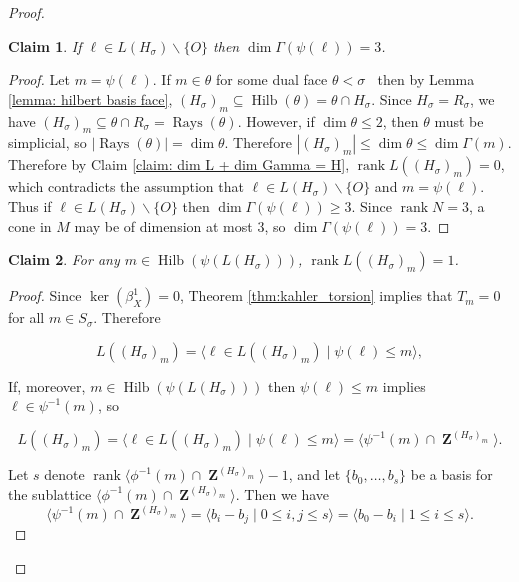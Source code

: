 \documentclass[10pt,a4paper]{amsart}
\newtheorem{claim}{Claim}
\DeclareMathOperator{\Hilb}{Hilb}
\DeclareMathOperator{\Rays}{Rays}
\DeclareMathOperator{\ZZ}{\mathbf{Z}}
\DeclareMathOperator{\dual}{\!^{\vee}}
\DeclareMathOperator{\rank}{rank}
\begin{document}
\begin{proof}
    \begin{claim} \label{claim: dim Gamma = 3}
        If $\ell \in L(H_\sigma) \backslash \{ O\}$ then $\dim \Gamma(\psi(\ell)) = 3$.
    \end{claim}
    \begin{proof}
        Let $m = \psi(\ell)$. If $m \in \theta$ for some dual face $\theta < \sigma\dual$ then by Lemma \ref{lemma: hilbert basis face}, $(H_\sigma)_m \subseteq \Hilb(\theta) =  \theta \cap H_\sigma$. Since $H_\sigma = R_\sigma$, we have $(H_\sigma)_m \subseteq \theta \cap R_\sigma= \Rays(\theta)$. However, if $\dim \theta \leq 2$, then $\theta$ must be simplicial, so $|\Rays(\theta)| = \dim \theta$. Therefore $|(H_\sigma)_m| \leq \dim \theta \leq \dim \Gamma(m)$. Therefore by Claim \ref{claim: dim L + dim Gamma = H}, $\rank L((H_\sigma)_m) = 0$, which contradicts the assumption that $\ell \in L(H_\sigma)\backslash \{O \} $ and $m = \psi(\ell)$. Thus if $\ell \in L(H_\sigma) \backslash \{ O\}$ then $\dim \Gamma(\psi(\ell)) \geq 3$. Since $\rank N =3$, a cone in $M$ may be of dimension at most $3$, so $\dim \Gamma(\psi(\ell)) = 3$.  \end{proof}

    \begin{claim} \label{claim: dim L(Hm) = 1}
        For any $m \in \Hilb(\psi(L(H_\sigma)))$, $\rank L((H_\sigma)_m) = 1$.
    \end{claim}
    \begin{proof}
        Since $\ker(\beta^1_X)=0$, Theorem \ref{thm:kahler_torsion} implies that $T_m = 0$ for all $m \in S_\sigma$. Therefore
	
	\begin{equation}
		L((H_\sigma)_m) = \langle \ell \in L((H_\sigma)_m) \mid \psi(\ell) \leq m \rangle,
	\end{equation}
	
	If, moreover, $m \in \Hilb(\psi(L(H_\sigma)))$ then $\psi(\ell) \leq m$ implies $\ell \in \psi^{-1}(m)$, so
	
	\begin{equation}
		L((H_\sigma)_m) = \langle \ell \in L((H_\sigma)_m) \mid \psi(\ell) \leq m \rangle = \langle \psi^{-1}(m) \cap \ZZ^{(H_\sigma)_m}\rangle.
	\end{equation}

    Let $s$ denote $\rank \langle \phi^{-1}(m) \cap \ZZ^{(H_\sigma)_m} \rangle - 1$, and let $\{ b_0, \ldots, b_s \}$ be a basis for the sublattice $ \langle \phi^{-1}(m) \cap \ZZ^{(H_\sigma)_m} \rangle$. Then we have 
    \begin{equation}
        \langle \psi^{-1}(m) \cap \ZZ^{(H_\sigma)_m}\rangle = \langle b_i - b_j \mid 0 \leq i,j\leq s \rangle = \langle b_0 -b_i \mid 1 \leq i \leq s \rangle.
    \end{equation}
    

\end{proof}
\end{proof}
\end{document}
